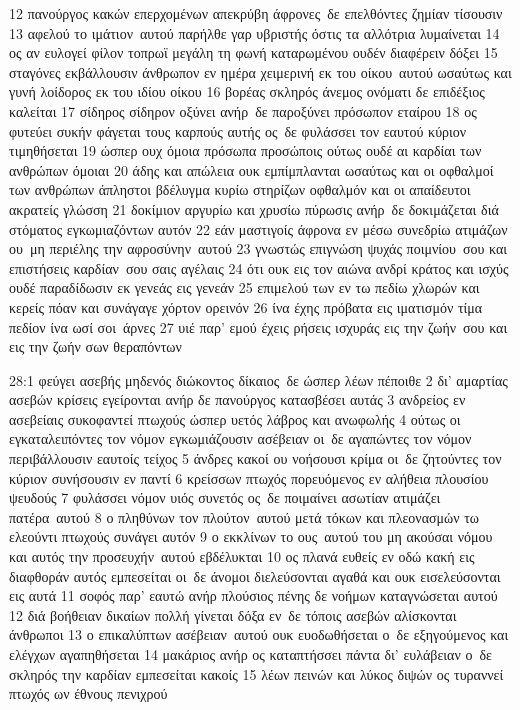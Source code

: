\documentclass[10pt,oneside,footinclude=true,headinclude=true]{scrbook} %
\begin{document}
12 πανούργος κακών επερχομένων απεκρύβη άφρονες δε επελθόντες ζημίαν τίσουσιν
13 αφελού το ιμάτιον αυτού παρήλθε γαρ υβριστής όστις τα αλλότρια λυμαίνεται
14 ος αν ευλογεί φίλον τοπρωϊ μεγάλη τη φωνή καταρωμένου ουδέν διαφέρειν δόξει
15 σταγόνες εκβάλλουσιν άνθρωπον εν ημέρα χειμερινή εκ του οίκου αυτού ωσαύτως και γυνή λοίδορος εκ του ιδίου οίκου
16 βορέας σκληρός άνεμος ονόματι δε επιδέξιος καλείται
17 σίδηρος σίδηρον οξύνει ανήρ δε παροξύνει πρόσωπον εταίρου
18 ος φυτεύει συκήν φάγεται τους καρπούς αυτής ος δε φυλάσσει τον εαυτού κύριον τιμηθήσεται
19 ώσπερ ουχ όμοια πρόσωπα προσώποις ούτως ουδέ αι καρδίαι των ανθρώπων όμοιαι
20 άδης και απώλεια ουκ εμπίμπλανται ωσαύτως και οι οφθαλμοί των ανθρώπων άπληστοι βδέλυγμα κυρίω στηρίζων οφθαλμόν και οι απαίδευτοι ακρατείς γλώσση
21 δοκίμιον αργυρίω και χρυσίω πύρωσις ανήρ δε δοκιμάζεται διά στόματος εγκωμιαζόντων αυτόν
22 εάν μαστιγοίς άφρονα εν μέσω συνεδρίω ατιμάζων ου μη περιέλης την αφροσύνην αυτού
23 γνωστώς επιγνώση ψυχάς ποιμνίου σου και επιστήσεις καρδίαν σου σαις αγέλαις
24 ότι ουκ εις τον αιώνα ανδρί κράτος και ισχύς ουδέ παραδίδωσιν εκ γενεάς εις γενεάν
25 επιμελού των εν τω πεδίω χλωρών και κερείς πόαν και συνάγαγε χόρτον ορεινόν
26 ίνα έχης πρόβατα εις ιματισμόν τίμα πεδίον ίνα ωσί σοι άρνες
27 υιέ παρ' εμού έχεις ρήσεις ισχυράς εις την ζωήν σου και εις την ζωήν σων θεραπόντων
\par
28:1 φεύγει ασεβής μηδενός διώκοντος δίκαιος δε ώσπερ λέων πέποιθε
2 δι' αμαρτίας ασεβών κρίσεις εγείρονται ανήρ δε πανούργος κατασβέσει αυτάς
3 ανδρείος εν ασεβείαις συκοφαντεί πτωχούς ώσπερ υετός λάβρος και ανωφωλής
4 ούτως οι εγκαταλειπόντες τον νόμον εγκωμιάζουσιν ασέβειαν οι δε αγαπώντες τον νόμον περιβάλλουσιν εαυτοίς τείχος
5 άνδρες κακοί ου νοήσουσι κρίμα οι δε ζητούντες τον κύριον συνήσουσιν εν παντί
6 κρείσσων πτωχός πορευόμενος εν αλήθεια πλουσίου ψευδούς
7 φυλάσσει νόμον υιός συνετός ος δε ποιμαίνει ασωτίαν ατιμάζει πατέρα αυτού
8 ο πληθύνων τον πλούτον αυτού μετά τόκων και πλεονασμών τω ελεούντι πτωχούς συνάγει αυτόν
9 ο εκκλίνων το ους αυτού του μη ακούσαι νόμου και αυτός την προσευχήν αυτού εβδέλυκται
10 ος πλανά ευθείς εν οδώ κακή εις διαφθοράν αυτός εμπεσείται οι δε άνομοι διελεύσονται αγαθά και ουκ εισελεύσονται εις αυτά
11 σοφός παρ' εαυτώ ανήρ πλούσιος πένης δε νοήμων καταγνώσεται αυτού
12 διά βοήθειαν δικαίων πολλή γίνεται δόξα εν δε τόποις ασεβών αλίσκονται άνθρωποι
13 ο επικαλύπτων ασέβειαν αυτού ουκ ευοδωθήσεται ο δε εξηγούμενος και ελέγχων αγαπηθήσεται
14 μακάριος ανήρ ος καταπτήσσει πάντα δι' ευλάβειαν ο δε σκληρός την καρδίαν εμπεσείται κακοίς
15 λέων πεινών και λύκος διψών ος τυραννεί πτωχός ων έθνους πενιχρού
\end{document}
